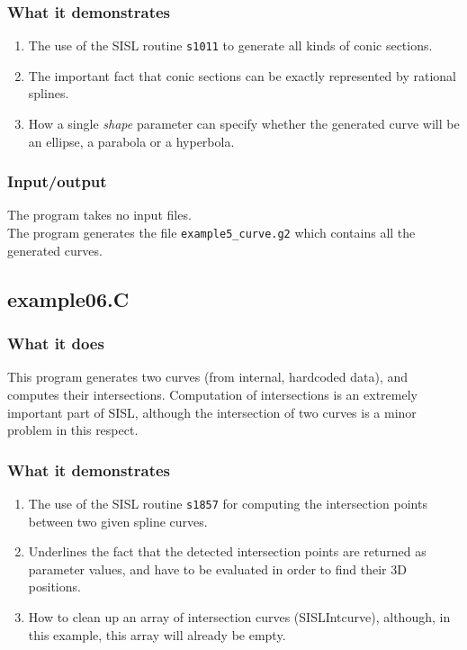 \subsubsection{What it demonstrates}
\begin{enumerate}
\item The use of the SISL routine \verb/s1011/ to generate all kinds of conic sections.
\item The important fact that conic sections can be exactly represented by rational splines.
\item How a single \emph{shape} parameter can specify whether the generated curve will be an
ellipse, a parabola or a hyperbola.
\end{enumerate}
\subsubsection{Input/output}
The program takes no input files.\\
The program generates the file \verb/example5_curve.g2/ which contains all the generated curves.

\subsection{example06.C}

\subsubsection{What it does}
This program generates two curves (from internal, hardcoded data), and computes their 
intersections.  Computation of intersections is an extremely important part of SISL, although 
the intersection of two curves is a minor problem in this respect.
\subsubsection{What it demonstrates}
\begin{enumerate}
\item The use of the SISL routine \verb/s1857/ for computing the intersection points between
two given spline curves.
\item Underlines the fact that the detected intersection points are returned as parameter values,
and have to be evaluated in order to find their 3D positions.
\item How to clean up an array of intersection curves (SISLIntcurve), although, in 
this example, this array will already be empty.
\end{enumerate}
